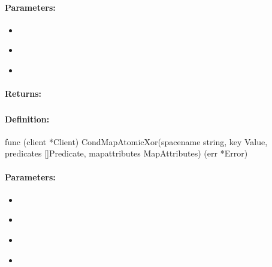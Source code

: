 \paragraph{Parameters:}
\begin{itemize}[noitemsep]
\item {}\\

\item {}\\

\item {}\\

\end{itemize}

\paragraph{Returns:}


\pagebreak
\subsubsection{}
\label{api:Go:CondMapAtomicXor}


\paragraph{Definition:}
\begin{gocode}
func (client *Client) CondMapAtomicXor(spacename string, key Value, predicates []Predicate, mapattributes MapAttributes) (err *Error)
\end{gocode}

\paragraph{Parameters:}
\begin{itemize}[noitemsep]
\item {}\\

\item {}\\

\item {}\\

\item {}\\

\end{itemize}

